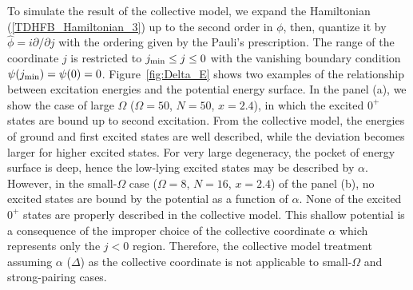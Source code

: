 \documentclass[%
superscriptaddress,
preprint,
showpacs,
nofootinbib,
amsmath,amssymb,
aps,
prc,
floatfix ]%
{revtex4-1}
\begin{document}
To simulate the result of the collective model, we expand the Hamiltonian
(\ref{TDHFB_Hamiltonian_3}) up to the second order in $\phi$,
then, quantize it by $\hat{\phi}=i\partial/\partial j$ with
the ordering given by the Pauli's prescription.
The range of the coordinate $j$ is restricted to $j_{\rm min}\leq j \leq 0$
with the vanishing boundary condition $\psi(j_{\rm min})=\psi(0)=0$.
Figure~\ref{fig:Delta_E} shows two examples of the relationship 
between excitation energies and the potential energy surface.
In the panel (a), we show the case of large $\Omega$
($\Omega=50$, $N=50$, $x=2.4$),
in which
the excited $0^+$ states are bound up to second excitation.
From the collective model, the energies of ground and first excited states
are well described, while the deviation becomes larger for
higher excited states.
For very large degeneracy, the pocket of energy surface is deep, 
hence the low-lying excited states may be described by $\alpha$. 
However, in the small-$\Omega$ case ($\Omega=8$, $N=16$, $x=2.4$)
of the panel (b), no excited states are bound by the potential
as a function of $\alpha$.
None of the excited $0^+$ states
are properly described in the collective model.
This shallow potential is a consequence of the improper
choice of the collective coordinate $\alpha$
which represents only the $j<0$ region.
Therefore, the collective model treatment assuming
$\alpha$ ($\Delta$) as the collective coordinate
is not applicable to small-$\Omega$ and strong-pairing cases.

\end{document}
